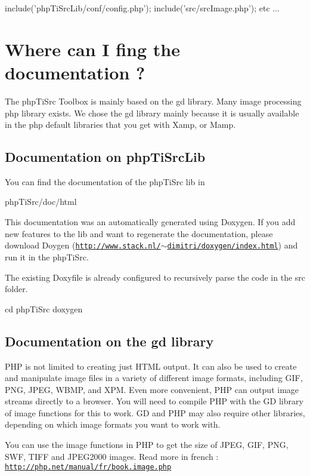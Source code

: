 \begin{DoxyCode}
 include('phpTiSrcLib/conf/config.php');
 include('src/srcImage.php');
 etc ... 
\end{DoxyCode}
\hypertarget{index_documentation}{}\section{\-Where can I fing the documentation ?}\label{index_documentation}
\-The php\-Ti\-Src \-Toolbox is mainly based on the gd library. \-Many image processing php library exists. \-We chose the gd library mainly because it is usually available in the php default libraries that you get with \-Xamp, or \-Mamp.\hypertarget{index_documentation_phpTiSrc}{}\subsection{\-Documentation on php\-Ti\-Src\-Lib}\label{index_documentation_phpTiSrc}
\-You can find the documentation of the php\-Ti\-Src lib in 
\begin{DoxyCode}
 phpTiSrc/doc/html
\end{DoxyCode}
 \par
 \-This documentation was an automatically generated using \-Doxygen. \-If you add new features to the lib and want to regenerate the documentation, please download \-Doygen (\href{http://www.stack.nl/~dimitri/doxygen/index.html}{\tt http\-://www.\-stack.\-nl/$\sim$dimitri/doxygen/index.\-html}) and run it in the php\-Ti\-Src. \par
 \-The existing \-Doxyfile is already configured to recursively parse the code in the src folder. 
\begin{DoxyCode}
 cd phpTiSrc
 doxygen
\end{DoxyCode}
\hypertarget{index_documentation_gd}{}\subsection{\-Documentation on the gd library}\label{index_documentation_gd}
\-P\-H\-P is not limited to creating just \-H\-T\-M\-L output. \-It can also be used to create and manipulate image files in a variety of different image formats, including \-G\-I\-F, \-P\-N\-G, \-J\-P\-E\-G, \-W\-B\-M\-P, and \-X\-P\-M. \-Even more convenient, \-P\-H\-P can output image streams directly to a browser. \-You will need to compile \-P\-H\-P with the \-G\-D library of image functions for this to work. \-G\-D and \-P\-H\-P may also require other libraries, depending on which image formats you want to work with.\par
 \par
 \-You can use the image functions in \-P\-H\-P to get the size of \-J\-P\-E\-G, \-G\-I\-F, \-P\-N\-G, \-S\-W\-F, \-T\-I\-F\-F and \-J\-P\-E\-G2000 images. \-Read more in french \-: \href{http://php.net/manual/fr/book.image.php}{\tt http\-://php.\-net/manual/fr/book.\-image.\-php} 